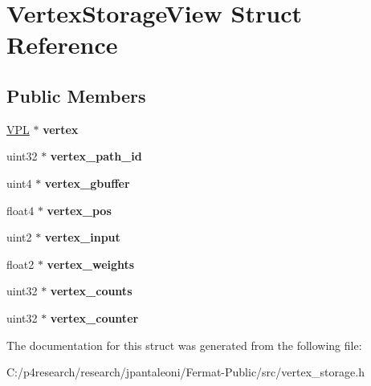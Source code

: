 \hypertarget{struct_vertex_storage_view}{}\section{Vertex\+Storage\+View Struct Reference}
\label{struct_vertex_storage_view}
\subsection*{Public Members}
\begin{DoxyCompactItemize}
\item 
\mbox{\label{struct_vertex_storage_view_add2503fe14160da57c6a2f4c0f322c55}} 
\hyperlink{struct_v_p_l}{V\+PL} $\ast$ {\bfseries vertex}
\item 
\mbox{\label{struct_vertex_storage_view_a2c346a517e7b5d43fd3f81ef2adb983f}} 
uint32 $\ast$ {\bfseries vertex\+\_\+path\+\_\+id}
\item 
\mbox{\label{struct_vertex_storage_view_aa6113fcaf2498cd0211843cf920be5f2}} 
uint4 $\ast$ {\bfseries vertex\+\_\+gbuffer}
\item 
\mbox{\label{struct_vertex_storage_view_afa279db808f7cf5195b4ee4b16dd6ed3}} 
float4 $\ast$ {\bfseries vertex\+\_\+pos}
\item 
\mbox{\label{struct_vertex_storage_view_ad9d186fdca623f1fe70136938a279ee8}} 
uint2 $\ast$ {\bfseries vertex\+\_\+input}
\item 
\mbox{\label{struct_vertex_storage_view_a9de32f9ce20f5b4b6f0a2ecb86c117ef}} 
float2 $\ast$ {\bfseries vertex\+\_\+weights}
\item 
\mbox{\label{struct_vertex_storage_view_ab8643c8d6398838e0d12c0362593f3c5}} 
uint32 $\ast$ {\bfseries vertex\+\_\+counts}
\item 
\mbox{\label{struct_vertex_storage_view_a4a7cc2b3016c3d5f2ebf8c1ae7bbffef}} 
uint32 $\ast$ {\bfseries vertex\+\_\+counter}
\end{DoxyCompactItemize}


The documentation for this struct was generated from the following file\+:\begin{DoxyCompactItemize}
\item 
C\+:/p4research/research/jpantaleoni/\+Fermat-\/\+Public/src/vertex\+\_\+storage.\+h\end{DoxyCompactItemize}

